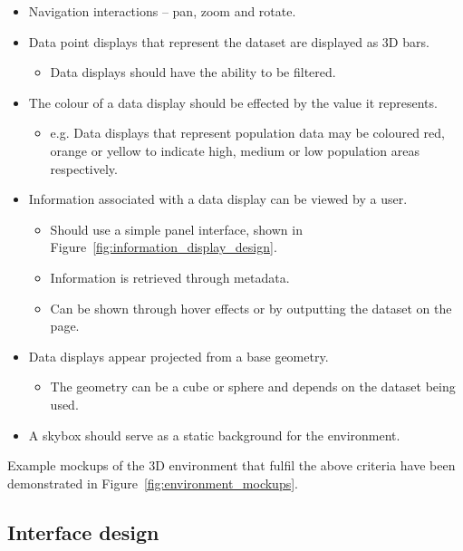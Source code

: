 {{		\begin{itemize}
			\item Navigation interactions -- pan, zoom and rotate.
			\item Data point displays that represent the dataset are displayed as 3D bars.
				\begin{itemize}
					\item Data displays should have the ability to be filtered.
				\end{itemize}
			\item The colour of a data display should be effected by the value it represents.
				\begin{itemize}
					\item e.g. Data displays that represent population data may be coloured red, orange or yellow to indicate high, medium or low population areas respectively.
				\end{itemize}
			\item Information associated with a data display can be viewed by a user.
				\begin{itemize}
					\item Should use a simple panel interface, shown in Figure~\ref{fig:information_display_design}.
					\item Information is retrieved through metadata. 
					\item Can be shown through hover effects or by outputting the dataset on the page.
				\end{itemize}
			\item Data displays appear projected from a base geometry.
				\begin{itemize}
					\item The geometry can be a cube or sphere and depends on the dataset being used.
				\end{itemize}
			\item A skybox should serve as a static background for the environment.
		\end{itemize}

		

		Example mockups of the 3D environment that fulfil the above criteria have been demonstrated in Figure~\ref{fig:environment_mockups}.

		

	}

	\subsection{Interface design} {
	\label{sec:interface_design}

}}
